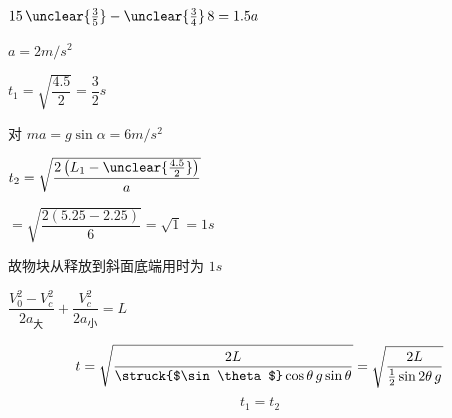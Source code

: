 \begin{problem}[21.（2+2+4=8）]
\begin{solution}
\hspace{1.6em}$15\,\unclear{\frac{3}{5}}-\unclear{\frac{3}{4}}\,8=1.5a$%

\hspace{1.6em}$a=2\unit{m/s^2}$

\hspace{1.6em}$t_1=\sqrt{\dfrac{4.5}{2}}=\dfrac{3}{2}\unit{s}$%

对 $m$\quad $a=g\sin\alpha=6\unit{m/s^2}$

\hspace{1.6em}$t_2=\sqrt{\dfrac{2\left(L_1-\unclear{\frac{4.5}{2}}\right)}{a}}$

\hspace{1.6em}$=\sqrt{\dfrac{2(5.25-2.25)}{6}}=\sqrt{1}=1\unit{s}$

故物块从释放到斜面底端用时为 $1\unit{s}$%
\end{solution}
\end{problem}

\quad $\dfrac{V_0^2-V_c^2}{2a_{\text{大}}}+\dfrac{V_c^2}{2a_{\text{小}}}=L$%

\[ t=\sqrt{\frac{2L}{\text{\struck{$\sin\theta$}}\cos\theta\, g\sin\theta}}=\sqrt{\frac{2L}{\frac12\sin2\theta\, g}} \]
\[ t_1=t_2 \]
